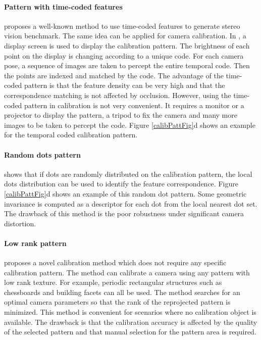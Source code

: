 \documentclass{report}
\begin{document}
\paragraph{Pattern with time-coded features} \cite{scharstein2003high} proposes a well-known method to use time-coded features to generate stereo vision benchmark. The same idea can be applied for camera calibration. In \cite{grosse2012camera, schmalz2011camera}, a display screen is used to display the calibration pattern. The brightness of each point on the display is changing according to a unique code. For each camera pose, a sequence of images are taken to percept the entire temporal code. Then the points are indexed and matched by the code. The advantage of the time-coded pattern is that the feature density can be very high and that the correspondence matching is not affected by occlusion. However, using the time-coded pattern in calibration is not very convenient. It requires a monitor or a projector to display the pattern, a tripod to fix the camera and many more images to be taken to percept the code. Figure \ref{calibPattFig}d shows an example for the temporal coded calibration pattern. 
\paragraph{Random dots pattern} \cite{oyamadasingle} shows that if dots are randomly distributed on the calibration pattern, the local dots distribution can be used to identify the feature correspondence. Figure \ref{calibPattFig}d shows an example of this random dot pattern. Some geometric invariance is computed as a descriptor for each dot from the local nearest dot set. The drawback of this method is the poor robustness under significant camera distortion. 
\paragraph{Low rank pattern} \cite{zhang2011camera} proposes a novel calibration method which does not require any specific calibration pattern. The method can calibrate a camera using any pattern with low rank texture. For example, periodic rectangular structures such as chessboards and building facets can all be used. The method searches for an optimal camera parameters so that the rank of the reprojected pattern is minimized. This method is convenient for scenarios where no calibration object is available. The drawback is that the calibration accuracy is affected by the quality of the selected pattern and that manual selection for the pattern area is required. 
\end{document}
